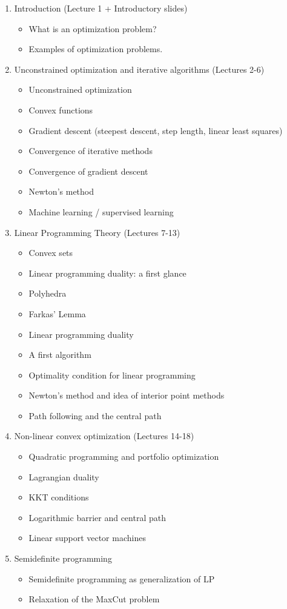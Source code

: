 \documentclass[11pt,a4paper]{memoir}
\begin{document}
\begin{enumerate}
\item Introduction (Lecture 1 + Introductory slides)
\begin{itemize}
 \item What is an optimization problem?
 \item Examples of optimization problems.
\end{itemize}
\item Unconstrained optimization and iterative algorithms (Lectures 2-6)
\begin{itemize}
 \item Unconstrained optimization
 \item Convex functions
 \item Gradient descent (steepest descent, step length, linear least squares)
 \item Convergence of iterative methods
 \item Convergence of gradient descent
 \item Newton's method
 \item Machine learning / supervised learning
\end{itemize}
\item Linear Programming Theory (Lectures 7-13)
\begin{itemize}
 \item Convex sets
 \item Linear programming duality: a first glance
 \item Polyhedra
 \item Farkas' Lemma
 \item Linear programming duality
 \item A first algorithm
 \item Optimality condition for linear programming
 \item Newton's method and idea of interior point methods
 \item Path following and the central path
\end{itemize}
\item Non-linear convex optimization (Lectures 14-18)
\begin{itemize}
\item Quadratic programming and portfolio optimization
\item Lagrangian duality
\item KKT conditions
\item Logarithmic barrier and central path
\item Linear support vector machines
\end{itemize}
\item Semidefinite programming
\begin{itemize}
\item Semidefinite programming as generalization of LP
\item Relaxation of the MaxCut problem
\end{itemize}
\end{enumerate}
\end{document}

